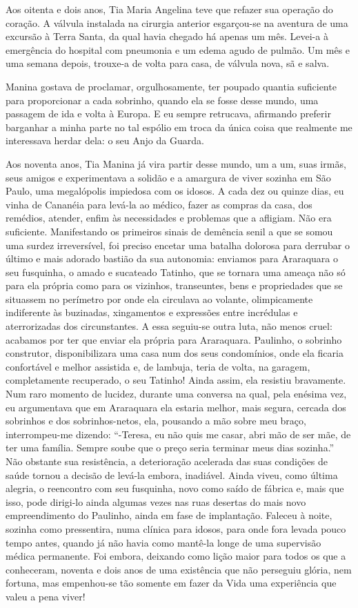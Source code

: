 Aos oitenta e dois anos, Tia Maria Angelina teve que refazer sua operação do coração.
A válvula instalada na cirurgia anterior esgarçou-se na aventura de uma excursão à Terra Santa, da qual havia chegado há apenas um mês.
Levei-a à emergência do hospital com pneumonia e um edema agudo de pulmão.
Um mês e uma semana depois, trouxe-a de volta para casa, de válvula nova, sã e salva.

Manina gostava de proclamar, orgulhosamente, ter poupado quantia suficiente para proporcionar a cada sobrinho, quando ela se fosse desse mundo, uma passagem de ida e volta à Europa.
E eu sempre retrucava, afirmando preferir barganhar a minha parte no tal espólio em troca da única coisa que realmente me interessava herdar dela: o seu Anjo da Guarda.

Aos noventa anos, Tia Manina já vira partir desse mundo, um a um, suas irmãs, seus amigos e experimentava a solidão e a amargura de viver sozinha em São Paulo, uma megalópolis impiedosa com os idosos.
A cada dez ou quinze dias, eu vinha de Cananéia para levá-la ao médico, fazer as compras da casa, dos remédios, atender, enfim às necessidades e problemas que a afligiam.
Não era suficiente.
Manifestando os primeiros sinais de demência senil a que se somou uma surdez irreversível, foi preciso encetar uma batalha dolorosa para derrubar o último e mais adorado bastião da sua autonomia: enviamos para Araraquara o seu fusquinha, o amado e sucateado Tatinho, que se tornara uma ameaça não só para ela própria  como para os vizinhos, transeuntes, bens e propriedades que se situassem no perímetro por onde ela circulava ao volante, olimpicamente  indiferente às buzinadas, xingamentos e expressões entre incrédulas e aterrorizadas dos circunstantes.
A essa seguiu-se outra luta, não menos cruel: acabamos por ter que enviar ela própria para Araraquara.
Paulinho, o sobrinho construtor, disponibilizara uma casa num dos seus condomínios, onde ela ficaria confortável e melhor assistida e, de lambuja, teria de volta, na garagem, completamente recuperado, o seu Tatinho!
Ainda assim, ela resistiu bravamente.
Num raro momento de lucidez, durante uma conversa na qual, pela enésima vez, eu argumentava que em Araraquara ela estaria melhor, mais segura, cercada dos sobrinhos e dos sobrinhos-netos, ela, pousando a mão sobre meu braço, interrompeu-me dizendo:
``-Teresa, eu não quis me casar, abri mão de ser mãe, de ter uma família.
Sempre soube que o preço seria terminar meus dias sozinha.''
Não obstante sua resistência, a deterioração acelerada das suas condições de saúde tornou a decisão de levá-la embora, inadiável.
Ainda viveu, como última alegria, o reencontro com seu fusquinha, novo como saído de fábrica e, mais que isso, pode dirigi-lo ainda algumas vezes nas ruas desertas do mais novo empreendimento do Paulinho, ainda em fase de implantação.
Faleceu à noite, sozinha como pressentira, numa clínica para idosos, para onde fora levada pouco tempo antes, quando já não havia como mantê-la longe de uma supervisão médica permanente.
Foi embora, deixando como lição maior para todos os que a conheceram, noventa e dois anos de uma existência que não perseguiu glória, nem fortuna, mas empenhou-se tão somente em fazer da Vida uma experiência que valeu a pena viver! 
